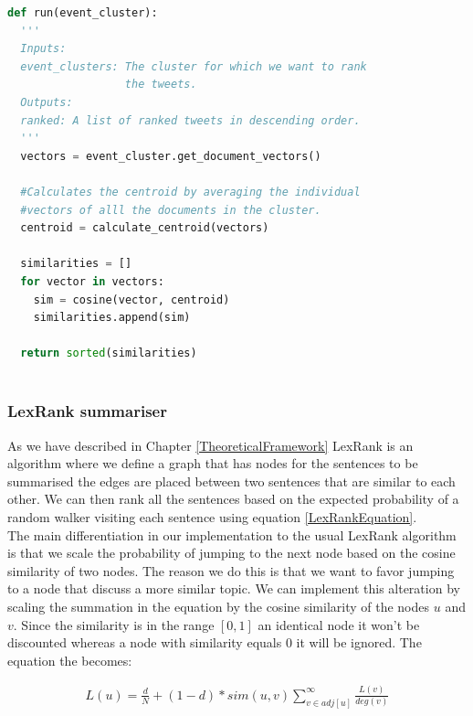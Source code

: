 \begin{lstlisting}[language=Python, label=CentroidSummariserSnippet, caption=Pseudocode for the centoid-based summariser.]
def run(event_cluster):
  '''
  Inputs:
  event_clusters: The cluster for which we want to rank 
                  the tweets.
  Outputs:
  ranked: A list of ranked tweets in descending order. 
  '''        
  vectors = event_cluster.get_document_vectors()
  
  #Calculates the centroid by averaging the individual
  #vectors of alll the documents in the cluster.
  centroid = calculate_centroid(vectors)
  
  similarities = []
  for vector in vectors:
    sim = cosine(vector, centroid)
    similarities.append(sim)
  
  return sorted(similarities)
  
\end{lstlisting}

\subsubsection{LexRank summariser}
As we have described in Chapter \ref{TheoreticalFramework} 
LexRank is an algorithm where we deﬁne a graph that has nodes for the sentences to be summarised the 
edges are placed between two sentences that are similar to each other. We can then rank all the sentences 
based on the expected probability of a random walker visiting each sentence using equation \ref{LexRankEquation}. \\
The main differentiation in our implementation to the usual LexRank algorithm is that we scale the probability of 
jumping to the next node based on the cosine similarity of two nodes. The reason we do this is that we want to favor jumping to 
a node that discuss a more similar topic. We can implement this alteration by scaling the summation in the equation by the cosine similarity 
of the nodes $u$ and $v$. Since the similarity is in the range $[0, 1]$ an identical node it won't be discounted whereas a node with similarity equals 0 
it will be ignored. The equation the becomes:

\begin{eqnarray}\label{LexRankEquationModified}
L(u) = \frac{d}{N} + (1-d) * sim(u, v) \sum_{v \in adj[u]}^{\infty}\frac{L(v)}{deg(v)}
\end{eqnarray} 

